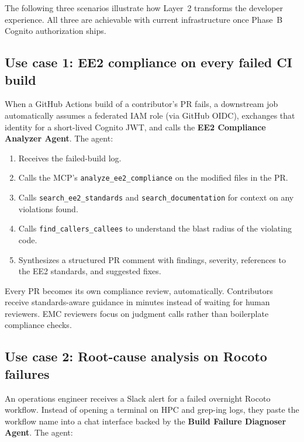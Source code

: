 \documentclass[11pt,letterpaper]{article}
\begin{document}
The following three scenarios illustrate how Layer~2 transforms the
developer experience. All three are achievable with current infrastructure
once Phase~B Cognito authorization ships.

\subsection{Use case 1: EE2 compliance on every failed CI build}

When a GitHub Actions build of a contributor's PR fails, a downstream job
automatically assumes a federated IAM role (via GitHub OIDC), exchanges
that identity for a short-lived Cognito JWT, and calls the
\textbf{EE2 Compliance Analyzer Agent}. The agent:

\begin{enumerate}[leftmargin=*, itemsep=1pt]
  \item Receives the failed-build log.
  \item Calls the MCP's \texttt{analyze\_ee2\_compliance} on the modified
        files in the PR.
  \item Calls \texttt{search\_ee2\_standards} and \texttt{search\_documentation}
        for context on any violations found.
  \item Calls \texttt{find\_callers\_callees} to understand the blast
        radius of the violating code.
  \item Synthesizes a structured PR comment with findings, severity,
        references to the EE2 standards, and suggested fixes.
\end{enumerate}

\begin{impact}
Every PR becomes its own compliance review, automatically.
Contributors receive standards-aware guidance in minutes instead of
waiting for human reviewers. EMC reviewers focus on judgment calls
rather than boilerplate compliance checks.
\end{impact}

\subsection{Use case 2: Root-cause analysis on Rocoto failures}

An operations engineer receives a Slack alert for a failed overnight
Rocoto workflow. Instead of opening a terminal on HPC and grep-ing logs,
they paste the workflow name into a chat interface backed by the
\textbf{Build Failure Diagnoser Agent}. The agent:
\end{document}
